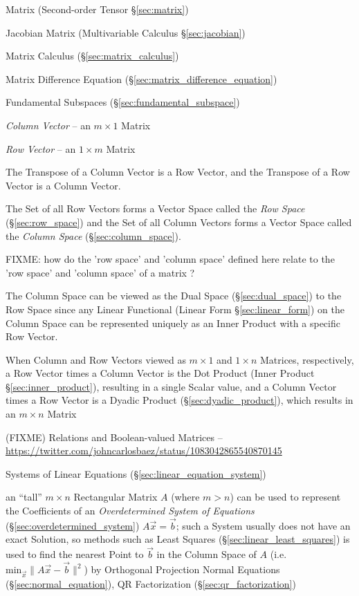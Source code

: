 \fist Matrix (Second-order Tensor \S\ref{sec:matrix})

\fist Jacobian Matrix (Multivariable Calculus \S\ref{sec:jacobian})

\fist Matrix Calculus (\S\ref{sec:matrix_calculus})

\fist Matrix Difference Equation (\S\ref{sec:matrix_difference_equation})

\fist Fundamental Subspaces (\S\ref{sec:fundamental_subspace})

\emph{Column Vector} -- an $m \times 1$ Matrix

\emph{Row Vector} -- an $1 \times m$ Matrix

The Transpose of a Column Vector is a Row Vector, and the Transpose of a Row
Vector is a Column Vector.

The Set of all Row Vectors forms a Vector Space called the \emph{Row Space}
(\S\ref{sec:row_space}) and the Set of all Column Vectors forms a Vector Space
called the \emph{Column Space} (\S\ref{sec:column_space}).

FIXME: how do the 'row space' and 'column space' defined here relate to the
'row space' and 'column space' of a matrix ?

The Column Space can be viewed as the Dual Space (\S\ref{sec:dual_space}) to
the Row Space since any Linear Functional (Linear Form \S\ref{sec:linear_form})
on the Column Space can be represented uniquely as an Inner Product with a
specific Row Vector.

When Column and Row Vectors viewed as $m \times 1$ and $1 \times n$ Matrices,
respectively, a Row Vector times a Column Vector is the Dot Product
(Inner Product \S\ref{sec:inner_product}), resulting in a single Scalar value,
and a Column Vector times a Row Vector is a Dyadic Product
(\S\ref{sec:dyadic_product}), which results in an $m \times n$ Matrix

(FIXME) Relations and Boolean-valued Matrices --
\url{https://twitter.com/johncarlosbaez/status/1083042865540870145}


Systems of Linear Equations (\S\ref{sec:linear_equation_system})

an ``tall'' $m \times n$ Rectangular Matrix $A$ (where $m > n$) can be used to
represent the Coefficients of an \emph{Overdetermined System of Equations}
(\S\ref{sec:overdetermined_system}) $A\vec{x} = \vec{b}$; such a System usually
does not have an exact Solution, so methods such as Least Squares
(\S\ref{sec:linear_least_squares}) is used to find the nearest Point to
$\vec{b}$ in the Column Space of $A$ (i.e.  $\mathrm{min}_{\vec{x}} \|A\vec{x} -
\vec{b}\|^2$) by Orthogonal Projection \fist Normal Equations
(\S\ref{sec:normal_equation}), QR Factorization (\S\ref{sec:qr_factorization})

